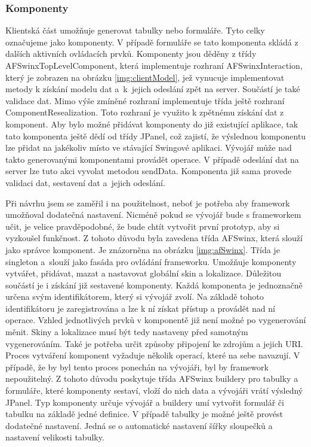 \subsubsection{Komponenty}
Klientská část umožňuje generovat tabulky nebo formuláře. Tyto celky označujeme jako komponenty. V případě formuláře se tato komponenta skládá z dalších aktivních ovládacích prvků. Komponenty jsou děděny z třídy AFSwinxTopLevelComponent, která implementuje rozhraní AFSwinxInteraction, který je zobrazen na obrázku \ref{img:clientModel}, jež vynucuje implementovat metody k získání modelu dat a~k~jejich odeslání zpět na server. Součástí je také validace dat. Mimo výše zmíněné rozhraní implementuje třída ještě rozhraní ComponentResealization. Toto rozhraní je využito k zpětnému získání dat z komponent. Aby bylo možné přidávat komponenty do již existující aplikace, tak tato komponenta ještě dědí od třídy JPanel, což zajistí, že výslednou komponentu lze přidat na jakékoliv místo ve stávající Swingové aplikaci. Vývojář může nad takto generovanými komponentami provádět operace. V případě odeslání dat na server lze tuto akci vyvolat metodou sendData. Komponenta již sama provede validaci dat, sestavení dat a~jejich odeslání.

Při návrhu jsem se zaměřil i na použitelnost, neboť je potřeba aby framework umožňoval dodatečná nastavení. Nicméně pokud se vývojář bude s frameworkem učit, je velice pravděpodobné, že bude chtít vytvořit první prototyp, aby si vyzkoušel funkčnost. Z tohoto důvodu byla zavedena třída AFSwinx, která slouží jako správce komponent. Je znázorněna na obrázku \ref{img:afSwinx}. Třída je singleton \cite{gamma} a~slouží jako fasáda \cite{gamma}pro ovládání frameworku.  Umožňuje komponenty vytvářet, přidávat, mazat a nastavovat globální skin a lokalizace. Důležitou součástí je i získání již sestavené komponenty. Každá komponenta je jednoznačně určena svým identifikátorem, který si vývojář zvolí. Na základě tohoto identifikátoru je zaregistrována a lze k ní získat přístup a provádět nad ní operace. Vzhled jednotlivých prvků v komponentě již není možné po vygenerování měnit. Skiny a lokalizace musí být tedy nastaveny před samotným vygenerováním. Také je potřeba určit způsoby připojení ke zdrojům a jejich URI. Proces vytváření komponent vyžaduje několik operací, které na sebe navazují. V případě, že by byl tento proces ponechán na vývojáři, byl by framework nepoužitelný. Z tohoto důvodu poskytuje třída AFSwinx buildery \cite{gamma} pro tabulky a formuláře, které komponenty sestaví, vloží do nich data a vývojáři vrátí výsledný JPanel. Typ komponenty určuje vývojář a buildery umí vytvořit formulář či tabulku na základě jedné definice. V případě tabulky je možné ještě provést dodatečné nastavení. Jedná se o automatické nastavení šířky sloupečků a nastavení velikosti tabulky.

